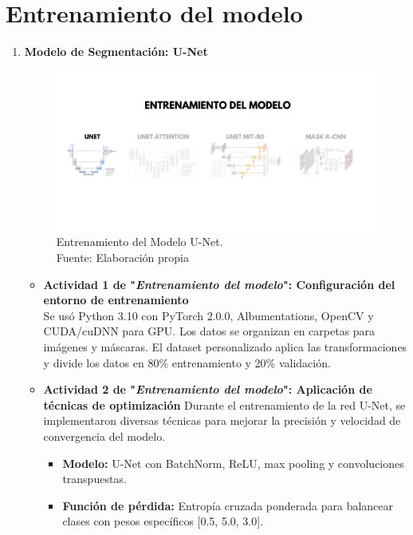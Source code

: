 \section{Entrenamiento del modelo}

\begin{enumerate}
  \item \textbf{Modelo de Segmentación: U-Net}
  \begin{figure}[H]
	\begin{center}
		\includegraphics[width=1\textwidth]{4/figures/entrunet.png}
		\caption[Entrenamiento del Modelo U-Net]{Entrenamiento del Modelo U-Net.\\
		Fuente: Elaboración propia}
		\label{4:figentunet}
	\end{center}
\end{figure}
  \begin{itemize}
  \item\textbf{Actividad 1 de "\textit{Entrenamiento del modelo}": Configuración del entorno de entrenamiento}\\
Se usó Python 3.10 con PyTorch 2.0.0, Albumentations, OpenCV y CUDA/cuDNN para GPU. Los datos se organizan en carpetas para imágenes y máscaras. El dataset personalizado aplica las transformaciones y divide los datos en 80\% entrenamiento y 20\% validación.

  \item\textbf{Actividad 2 de "\textit{Entrenamiento del modelo}": Aplicación de técnicas de optimización}
  Durante el entrenamiento de la red U-Net, se implementaron diversas técnicas para mejorar la precisión y velocidad de convergencia del modelo.

\begin{itemize}
\item \textbf{Modelo:} U-Net con BatchNorm, ReLU, max pooling y convoluciones transpuestas.

\item \textbf{Función de pérdida:} Entropía cruzada ponderada para balancear clases con pesos específicos [0.5, 5.0, 3.0].


\end{itemize}
\end{itemize}
\end{enumerate}
